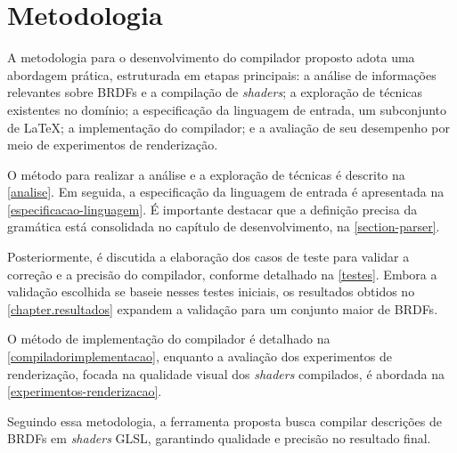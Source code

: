 \chapter{Metodologia} \label{metodologia}

A metodologia para o desenvolvimento do compilador proposto adota uma abordagem prática, estruturada em etapas principais: a análise de informações relevantes sobre BRDFs e a compilação de \textit{shaders}; a exploração de técnicas existentes no domínio; a especificação da linguagem de entrada, um subconjunto de \LaTeX{}; a implementação do compilador; e a avaliação de seu desempenho por meio de experimentos de renderização.

O método para realizar a análise e a exploração de técnicas é descrito na \autoref{analise}. Em seguida, a especificação da linguagem de entrada é apresentada na \autoref{especificacao-linguagem}. É importante destacar que a definição precisa da gramática está consolidada no capítulo de desenvolvimento, na \autoref{section-parser}.

Posteriormente, é discutida a elaboração dos casos de teste para validar a correção e a precisão do compilador, conforme detalhado na \autoref{testes}. Embora a validação escolhida se baseie nesses testes iniciais, os resultados obtidos no \autoref{chapter.resultados} expandem a validação para um conjunto maior de BRDFs.

O método de implementação do compilador é detalhado na \autoref{compiladorimplementacao}, enquanto a avaliação dos experimentos de renderização, focada na qualidade visual dos \textit{shaders} compilados, é abordada na \autoref{experimentos-renderizacao}.


Seguindo essa metodologia, a ferramenta proposta busca compilar descrições de BRDFs em \textit{shaders} GLSL, garantindo qualidade e precisão no resultado final.




